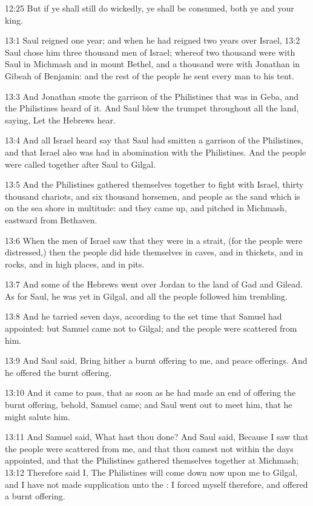 12:25 But if ye shall still do wickedly, ye shall be consumed, both ye
and your king.

13:1 Saul reigned one year; and when he had reigned two years over
Israel, 13:2 Saul chose him three thousand men of Israel; whereof two
thousand were with Saul in Michmash and in mount Bethel, and a
thousand were with Jonathan in Gibeah of Benjamin: and the rest of the
people he sent every man to his tent.

13:3 And Jonathan smote the garrison of the Philistines that was in
Geba, and the Philistines heard of it. And Saul blew the trumpet
throughout all the land, saying, Let the Hebrews hear.

13:4 And all Israel heard say that Saul had smitten a garrison of the
Philistines, and that Israel also was had in abomination with the
Philistines. And the people were called together after Saul to Gilgal.

13:5 And the Philistines gathered themselves together to fight with
Israel, thirty thousand chariots, and six thousand horsemen, and
people as the sand which is on the sea shore in multitude: and they
came up, and pitched in Michmash, eastward from Bethaven.

13:6 When the men of Israel saw that they were in a strait, (for the
people were distressed,) then the people did hide themselves in caves,
and in thickets, and in rocks, and in high places, and in pits.

13:7 And some of the Hebrews went over Jordan to the land of Gad and
Gilead. As for Saul, he was yet in Gilgal, and all the people followed
him trembling.

13:8 And he tarried seven days, according to the set time that Samuel
had appointed: but Samuel came not to Gilgal; and the people were
scattered from him.

13:9 And Saul said, Bring hither a burnt offering to me, and peace
offerings. And he offered the burnt offering.

13:10 And it came to pass, that as soon as he had made an end of
offering the burnt offering, behold, Samuel came; and Saul went out to
meet him, that he might salute him.

13:11 And Samuel said, What hast thou done? And Saul said, Because I
saw that the people were scattered from me, and that thou camest not
within the days appointed, and that the Philistines gathered
themselves together at Michmash; 13:12 Therefore said I, The
Philistines will come down now upon me to Gilgal, and I have not made
supplication unto the \LORD: I forced myself therefore, and offered a
burnt offering.

